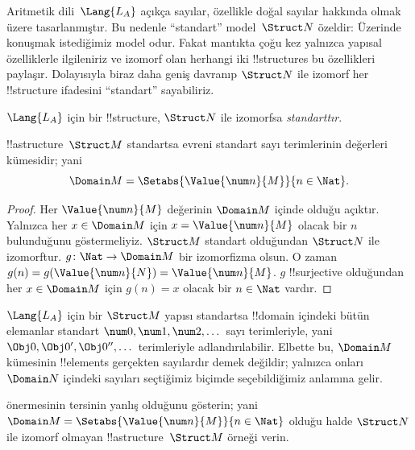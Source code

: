 


Aritmetik dili~$\Lang{L_A}$ açıkça sayılar, özellikle doğal sayılar
hakkında olmak üzere tasarlanmıştır. Bu nedenle ``standart''
model~$\Struct N$ özeldir: Üzerinde konuşmak istediğimiz model odur.
Fakat mantıkta çoğu kez yalnızca yapısal özelliklerle ilgileniriz ve
izomorf olan herhangi iki !!{structure}s bu özellikleri paylaşır.
Dolayısıyla biraz daha geniş davranıp $\Struct N$ ile izomorf her
!!{structure} ifadesini ``standart'' sayabiliriz.

\begin{defn}
$\Lang{L_A}$ için bir !!{structure}, $\Struct N$ ile izomorfsa
\emph{standarttır}.
\end{defn}

\begin{prop}
 !!a{structure}~$\Struct M$ standartsa
evreni standart sayı terimlerinin değerleri kümesidir; yani
\[
\Domain M=\Setabs{\Value{\num n}{M}}{n\in\Nat}.
\]
\end{prop}

\begin{proof}
Her $\Value{\num n}{M}$ değerinin $\Domain M$ içinde olduğu açıktır.
Yalnızca her $x\in\Domain M$ için $x=\Value{\num n}{M}$ olacak bir
$n$ bulunduğunu göstermeliyiz. $\Struct M$ standart olduğundan
$\Struct N$ ile izomorftur. $g\colon\Nat\to\Domain M$ bir izomorfizma
olsun. O zaman
$g(n)=g(\Value{\num n}{N})=\Value{\num n}{M}$. $g$ !!{surjective}
olduğundan her $x\in\Domain M$ için $g(n)=x$ olacak bir $n\in\Nat$
vardır.
\end{proof}

\begin{explain}
$\Lang{L_A}$ için bir $\Struct M$ yapısı standartsa !!{domain}
içindeki bütün elemanlar standart $\num0,\num1,\num2,\dots$ sayı
terimleriyle, yani $\Obj0,\Obj0',\Obj0'',\dots$ terimleriyle
adlandırılabilir. Elbette bu, $\Domain M$ kümesinin !!{element}s
gerçekten sayılardır demek değildir; yalnızca onları $\Domain N$
içindeki sayıları seçtiğimiz biçimde seçebildiğimiz anlamına gelir.
\end{explain}

\begin{prob}
 önermesinin tersinin yanlış
olduğunu gösterin; yani
$\Domain M=\Setabs{\Value{\num n}{M}}{n\in\Nat}$ olduğu halde
$\Struct N$ ile izomorf olmayan !!a{structure}~$\Struct M$ örneği verin.
\end{prob}


